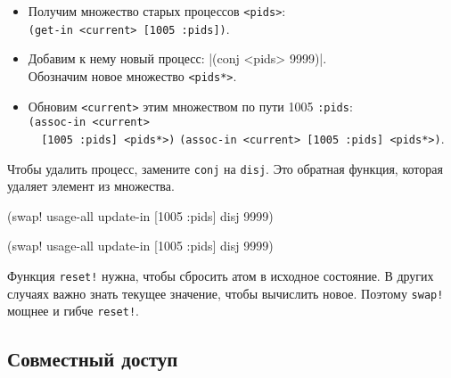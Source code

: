 \begin{itemize}

\item
  Получим множество старых процессов \verb|<pids>|:\\
  \verb|(get-in <current> [1005 :pids])|.

\item
  Добавим к нему новый процесс: \spverb|(conj <pids> 9999)|.\ifx\DEVICETYPE\MOBILE\ \else\\\fi
  Обозначим новое множество \verb|<pids*>|.

\item
  Обновим \verb|<current>| этим множеством по пути 1005 \arr{} \verb|:pids|:\\
  \ifx\DEVICETYPE\MOBILE
  \verb|(assoc-in <current>| \\
  \verb|  [1005 :pids] <pids*>)|
  \else
  \verb|(assoc-in <current> [1005 :pids] <pids*>)|.
  \fi

\end{itemize}

\noindent
Чтобы удалить процесс, замените \verb|conj| на \verb|disj|. Это обратная
функция, которая удаляет элемент из множества.


\ifx\DEVICETYPE\MOBILE

\begin{english}
  \begin{clojure}
(swap! usage-all
  update-in [1005 :pids] disj 9999)
  \end{clojure}
\end{english}

\else

\begin{english}
  \begin{clojure}
(swap! usage-all update-in [1005 :pids] disj 9999)
  \end{clojure}
\end{english}

\fi

Функция \verb|reset!| нужна, чтобы сбросить атом в исходное состояние. В
других случаях важно знать текущее значение, чтобы вычислить новое. Поэтому
\verb|swap!| мощнее и гибче \verb|reset!|.

\subsection{Совместный доступ}

